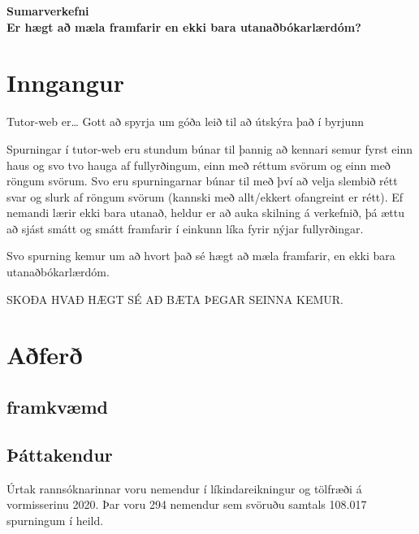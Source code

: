\documentclass[
  12pt,
]{article}
\author{}
\date{\vspace{-2.5em}}
\begin{document}
\begin{center}
\LARGE{\textbf{Sumarverkefni}}\\
\vspace*{2\baselineskip}
\Large{\textbf{Er hægt að mæla framfarir en ekki bara utanaðbókarlærdóm?}}
\end{center}
\thispagestyle{empty}
\newpage

\hypertarget{inngangur}{%
\section{Inngangur}\label{inngangur}}

Tutor-web er\ldots{} Gott að spyrja um góða leið til að útskýra það í byrjunn

Spurningar í tutor-web eru stundum búnar til þannig að kennari semur fyrst einn haus og svo tvo hauga af fullyrðingum, einn með réttum svörum og einn með röngum svörum. Svo eru spurningarnar búnar til með því að velja slembið rétt svar og slurk af röngum svörum (kannski með allt/ekkert ofangreint er rétt). Ef nemandi lærir ekki bara utanað, heldur er að auka skilning á verkefnið, þá ættu að sjást smátt og smátt framfarir í einkunn líka fyrir nýjar fullyrðingar.

Svo spurning kemur um að hvort það sé hægt að mæla framfarir, en ekki bara utanaðbókarlærdóm.

SKOÐA HVAÐ HÆGT SÉ AÐ BÆTA ÞEGAR SEINNA KEMUR.

\hypertarget{auxf0feruxf0}{%
\section{Aðferð}\label{auxf0feruxf0}}

\hypertarget{framkvuxe6md}{%
\subsection{framkvæmd}\label{framkvuxe6md}}

\hypertarget{uxfeuxe1ttakendur}{%
\subsection{Þáttakendur}\label{uxfeuxe1ttakendur}}

Úrtak rannsóknarinnar voru nemendur í líkindareikningur og tölfræði á vormisserinu 2020. Þar voru 294 nemendur sem svöruðu samtals 108.017 spurningum í heild.
\end{document}
